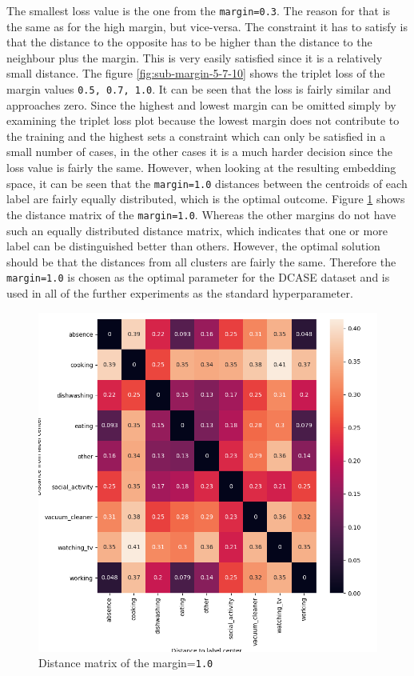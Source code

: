 \newline
\newline
The smallest loss value is the one from the \texttt{margin=0.3}. The reason for that is the same as for the high margin, but vice-versa. The constraint it has to satisfy is that the distance to the opposite has to be higher than the distance to the neighbour plus the margin. This is very easily satisfied since it is a relatively small distance.
\newline
\newline
The figure \ref{fig:sub-margin-5-7-10} shows the triplet loss of the margin values \texttt{0.5, 0.7, 1.0}. It can be seen that the loss is fairly similar and approaches zero.
\newline
\newline
Since the highest and lowest margin can be omitted simply by examining the triplet loss plot because the lowest margin does not contribute to the training and the highest sets a constraint which can only be satisfied in a small number of cases, in the other cases it is a much harder decision since the loss value is fairly the same. However, when looking at the resulting embedding space, it can be seen that the \texttt{margin=1.0} distances between the centroids of each label are fairly equally distributed, which is the optimal outcome. Figure \ref{fig:dist-margin-1} shows the distance matrix of the \texttt{margin=1.0}. Whereas the other margins do not have such an equally distributed distance matrix, which indicates that one or more label can be distinguished better than others. However, the optimal solution should be that the distances from all clusters are fairly the same. Therefore the \texttt{margin=1.0} is chosen as the optimal parameter for the DCASE dataset and is used in all of the further experiments as the standard hyperparameter.
\begin{figure}[tb]
\centering
    \includegraphics[width=0.5\linewidth]{study-doc/experiment_margin/assets/distance_mat_margin_1.png}
    \caption{Distance matrix of the margin=\texttt{1.0}}
    \label{fig:dist-margin-1}
\end{figure}

